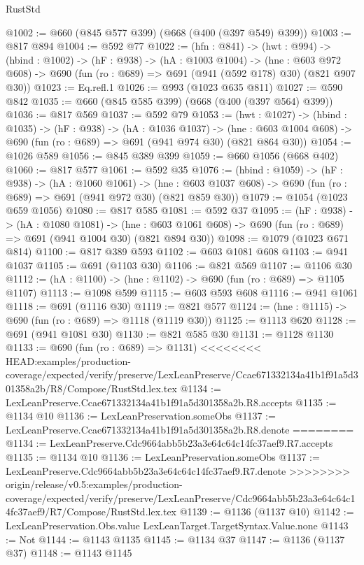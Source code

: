 \begin{lexlean}{RustStd}
\begin{coremodule}
{\begin{coremodule}
@1002 := @660 (@845 @577 @399) (@668 (@400 (@397 @549) @399))
@1003 := @817 @894
@1004 := @592 @77
@1022 := (hfn : @841) ->
  (hwt : @994) ->
  (hbind : @1002) ->
  (hF : @938) ->
  (hA : @1003 @1004) ->
  (hne : @603 @972 @608) -> @690 (fun (ro : @689) => @691 (@941 (@592 @178) @30) (@821 @907 @30))
@1023 := Eq.refl.{1}
@1026 := @993 (@1023 @635 @811)
@1027 := @590 @842
@1035 := @660 (@845 @585 @399) (@668 (@400 (@397 @564) @399))
@1036 := @817 @569
@1037 := @592 @79
@1053 := (hwt : @1027) ->
  (hbind : @1035) ->
  (hF : @938) ->
  (hA : @1036 @1037) ->
  (hne : @603 @1004 @608) -> @690 (fun (ro : @689) => @691 (@941 @974 @30) (@821 @864 @30))
@1054 := @1026 @589
@1056 := @845 @389 @399
@1059 := @660 @1056 (@668 @402)
@1060 := @817 @577
@1061 := @592 @35
@1076 := (hbind : @1059) ->
  (hF : @938) ->
  (hA : @1060 @1061) ->
  (hne : @603 @1037 @608) -> @690 (fun (ro : @689) => @691 (@941 @972 @30) (@821 @859 @30))
@1079 := @1054 (@1023 @659 @1056)
@1080 := @817 @585
@1081 := @592 @37
@1095 := (hF : @938) ->
  (hA : @1080 @1081) ->
  (hne : @603 @1061 @608) -> @690 (fun (ro : @689) => @691 (@941 @1004 @30) (@821 @894 @30))
@1098 := @1079 (@1023 @671 @814)
@1100 := @817 @389 @593
@1102 := @603 @1081 @608
@1103 := @941 @1037
@1105 := @691 (@1103 @30)
@1106 := @821 @569
@1107 := @1106 @30
@1112 := (hA : @1100) -> (hne : @1102) -> @690 (fun (ro : @689) => @1105 @1107)
@1113 := @1098 @599
@1115 := @603 @593 @608
@1116 := @941 @1061
@1118 := @691 (@1116 @30)
@1119 := @821 @577
@1124 := (hne : @1115) -> @690 (fun (ro : @689) => @1118 (@1119 @30))
@1125 := @1113 @620
@1128 := @691 (@941 @1081 @30)
@1130 := @821 @585 @30
@1131 := @1128 @1130
@1133 := @690 (fun (ro : @689) => @1131)
<<<<<<<< HEAD:examples/production-coverage/expected/verify/preserve/LexLeanPreserve/Ccae671332134a41b1f91a5d301358a2b/R8/Compose/RustStd.lex.tex
@1134 := LexLeanPreserve.Ccae671332134a41b1f91a5d301358a2b.R8.accepts
@1135 := @1134 @10
@1136 := LexLeanPreservation.someObs
@1137 := LexLeanPreserve.Ccae671332134a41b1f91a5d301358a2b.R8.denote
========
@1134 := LexLeanPreserve.Cdc9664abb5b23a3e64c64c14fc37aef9.R7.accepts
@1135 := @1134 @10
@1136 := LexLeanPreservation.someObs
@1137 := LexLeanPreserve.Cdc9664abb5b23a3e64c64c14fc37aef9.R7.denote
>>>>>>>> origin/release/v0.5:examples/production-coverage/expected/verify/preserve/LexLeanPreserve/Cdc9664abb5b23a3e64c64c14fc37aef9/R7/Compose/RustStd.lex.tex
@1139 := @1136 (@1137 @10)
@1142 := LexLeanPreservation.Obs.value LexLeanTarget.TargetSyntax.Value.none
@1143 := Not
@1144 := @1143 @1135
@1145 := @1134 @37
@1147 := @1136 (@1137 @37)
@1148 := @1143 @1145

\end{coremodule}}
\end{coremodule}
\end{lexlean}
